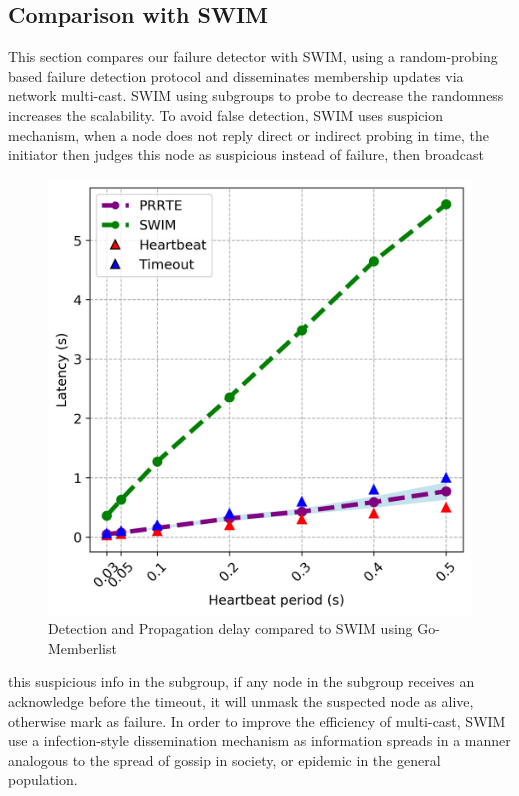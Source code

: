 \documentclass[sigconf]{acmart}
\begin{document}
\subsection{Comparison with SWIM}
This section compares our failure detector with SWIM\cite{Abhinandan02}, using a random-probing based failure detection protocol and disseminates membership updates via network multi-cast. SWIM using subgroups to probe to decrease the randomness increases the scalability. To avoid false detection, SWIM uses suspicion mechanism, when a node does not reply direct or indirect probing in time, the initiator then judges this node as suspicious instead of failure, then broadcast
\begin{figure}[h]
  \centering
  \includegraphics[width=\linewidth]{HB_prrte_swim.png}
  \caption{Detection and Propagation delay compared to SWIM using Go-Memberlist}
\end{figure}
this suspicious info in the subgroup, if any node in the subgroup receives an acknowledge before the timeout, it will unmask the suspected node as alive, otherwise mark as failure. In order to improve the efficiency of multi-cast, SWIM use a infection-style dissemination mechanism as information spreads in a manner analogous to the spread of gossip in society, or epidemic in the general population.
\end{document}
